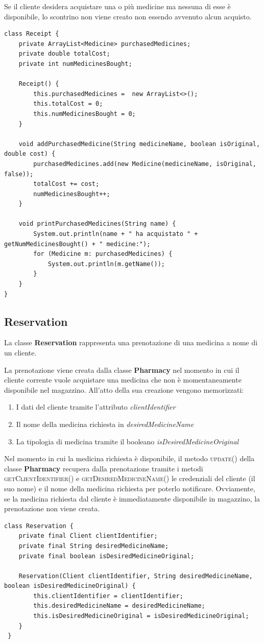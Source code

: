 \documentclass[a4paper, 10pt]{report}
\begin{document}
Se il cliente desidera acquistare una o più medicine ma nessuna di esse è disponibile, lo scontrino non viene creato non essendo avvenuto alcun acquisto.\\
\begin{lstlisting}
class Receipt {
    private ArrayList<Medicine> purchasedMedicines;
    private double totalCost;
    private int numMedicinesBought;

    Receipt() {
        this.purchasedMedicines =  new ArrayList<>();
        this.totalCost = 0;
        this.numMedicinesBought = 0;
    }

    void addPurchasedMedicine(String medicineName, boolean isOriginal, double cost) {
        purchasedMedicines.add(new Medicine(medicineName, isOriginal, false));
        totalCost += cost;
        numMedicinesBought++;
    }

    void printPurchasedMedicines(String name) {
        System.out.println(name + " ha acquistato " + getNumMedicinesBought() + " medicine:");
        for (Medicine m: purchasedMedicines) {
            System.out.println(m.getName());
        }
    }
}
\end{lstlisting}
\subsection{Reservation}
La classe \textbf{Reservation} rappresenta una prenotazione di una medicina a nome di un cliente.

La prenotazione viene creata dalla classe \textbf{Pharmacy} nel momento in cui il cliente corrente vuole acquistare una medicina che non è momentaneamente disponibile nel magazzino. All'atto della sua creazione vengono memorizzati:
\begin{enumerate}
\item I dati del cliente tramite l'attributo \textit{clientIdentifier}
\item Il nome della medicina richiesta in \textit{desiredMedicineName}
\item La tipologia di medicina tramite il booleano \textit{isDesiredMedicineOriginal}
\end{enumerate}
Nel momento in cui la medicina richiesta è disponibile, il metodo \textsc{update()} della classe \textbf{Pharmacy} recupera dalla prenotazione tramite i metodi \textsc{getClientIdentifier()} e \textsc{getDesiredMedicineName()} le credenziali del cliente (il suo nome) e il nome della medicina richiesta per poterlo notificare. Ovviamente, se la medicina richiesta dal cliente è immediatamente disponibile in magazzino, la prenotazione non viene creata.\\
\begin{lstlisting}
class Reservation {
    private final Client clientIdentifier;
    private final String desiredMedicineName;
    private final boolean isDesiredMedicineOriginal;

    Reservation(Client clientIdentifier, String desiredMedicineName, boolean isDesiredMedicineOriginal) {
        this.clientIdentifier = clientIdentifier;
        this.desiredMedicineName = desiredMedicineName;
        this.isDesiredMedicineOriginal = isDesiredMedicineOriginal;
    }
 }
\end{lstlisting}
\end{document}
